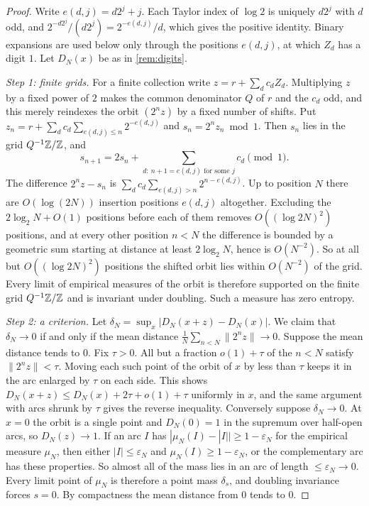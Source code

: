 \documentclass[11pt]{article}
\begin{document}
\begin{proof}
Write $e(d,j)=d2^j+j$. Each Taylor index of $\log2$ is uniquely $d2^j$ with $d$ odd, and $2^{-d2^j}/(d2^j)=2^{-e(d,j)}/d$, which gives the positive identity. Binary expansions are used below only through the positions $e(d,j)$, at which $Z_d$ has a digit $1$. Let $D_N(x)$ be as in \cref{rem:digits}.

\emph{Step 1: finite grids.} For a finite collection write $z=r+\sum_dc_dZ_d$. Multiplying $z$ by a fixed power of $2$ makes the common denominator $Q$ of $r$ and the $c_d$ odd, and this merely reindexes the orbit $(2^nz)$ by a fixed number of shifts. Put $z_n=r+\sum_dc_d\sum_{e(d,j)\le n}2^{-e(d,j)}$ and $s_n=2^nz_n\bmod1$. Then $s_n$ lies in the grid $Q^{-1}\mathbb Z/\mathbb Z$, and
\[
 s_{n+1}=2s_n+\sum_{d:\ n+1=e(d,j)\text{ for some }j}c_d\pmod1 .
\]
The difference $2^nz-s_n$ is $\sum_dc_d\sum_{e(d,j)>n}2^{n-e(d,j)}$. Up to position $N$ there are $O(\log(2N))$ insertion positions $e(d,j)$ altogether. Excluding the $2\log_2N+O(1)$ positions before each of them removes $O((\log2N)^2)$ positions, and at every other position $n<N$ the difference is bounded by a geometric sum starting at distance at least $2\log_2N$, hence is $O(N^{-2})$. So at all but $O((\log2N)^2)$ positions the shifted orbit lies within $O(N^{-2})$ of the grid. Every limit of empirical measures of the orbit is therefore supported on the finite grid $Q^{-1}\mathbb Z/\mathbb Z$ and is invariant under doubling. Such a measure has zero entropy.

\emph{Step 2: a criterion.} Let $\delta_N=\sup_x|D_N(x+z)-D_N(x)|$. We claim that $\delta_N\to0$ if and only if the mean distance $\frac1N\sum_{n<N}\|2^nz\|\to0$. Suppose the mean distance tends to $0$. Fix $\tau>0$. All but a fraction $o(1)+\tau$ of the $n<N$ satisfy $\|2^nz\|<\tau$. Moving each such point of the orbit of $x$ by less than $\tau$ keeps it in the arc enlarged by $\tau$ on each side. This shows $D_N(x+z)\le D_N(x)+2\tau+o(1)+\tau$ uniformly in $x$, and the same argument with arcs shrunk by $\tau$ gives the reverse inequality. Conversely suppose $\delta_N\to0$. At $x=0$ the orbit is a single point and $D_N(0)=1$ in the supremum over half-open arcs, so $D_N(z)\to1$. If an arc $I$ has $|\mu_N(I)-|I||\ge1-\varepsilon_N$ for the empirical measure $\mu_N$, then either $|I|\le\varepsilon_N$ and $\mu_N(I)\ge1-\varepsilon_N$, or the complementary arc has these properties. So almost all of the mass lies in an arc of length $\le\varepsilon_N\to0$. Every limit point of $\mu_N$ is therefore a point mass $\delta_s$, and doubling invariance forces $s=0$. By compactness the mean distance from $0$ tends to $0$.


\end{proof}
\end{document}
